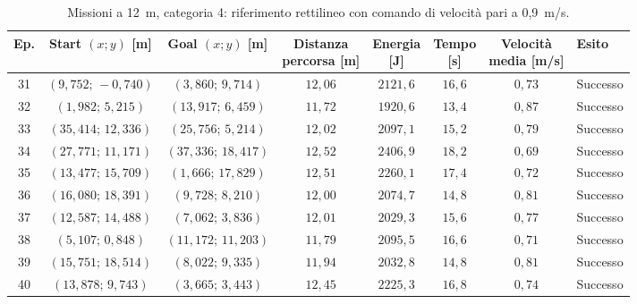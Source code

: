 \begin{table}[H]
\centering
\caption{Missioni a 12~m, categoria 4: riferimento rettilineo con comando di velocità pari a 0,9~m/s.}
\label{tab:straight-line-0-9-12m-cat4}
\begingroup
\fontsize{9}{11}\selectfont
\setlength{\tabcolsep}{2.5pt}
\renewcommand{\arraystretch}{1.2}
\begin{tabular}{@{}c cc cccc l@{}}
\toprule
Ep. & \shortstack{Start $(x;y)$\\{}[m]} & \shortstack{Goal $(x;y)$\\{}[m]} & \shortstack{Distanza\\percorsa [m]} & \shortstack{Energia\\{}[J]} & \shortstack{Tempo\\{}[s]} & \shortstack{Velocità\\media [m/s]} & Esito \\
\midrule
31 & $(9{,}752;\,-0{,}740)$ & $(3{,}860;\,9{,}714)$ & $12{,}06$ & $2121{,}6$ & $16{,}6$ & $0{,}73$ & Successo \\
32 & $(1{,}982;\,5{,}215)$ & $(13{,}917;\,6{,}459)$ & $11{,}72$ & $1920{,}6$ & $13{,}4$ & $0{,}87$ & Successo \\
33 & $(35{,}414;\,12{,}336)$ & $(25{,}756;\,5{,}214)$ & $12{,}02$ & $2097{,}1$ & $15{,}2$ & $0{,}79$ & Successo \\
34 & $(27{,}771;\,11{,}171)$ & $(37{,}336;\,18{,}417)$ & $12{,}52$ & $2406{,}9$ & $18{,}2$ & $0{,}69$ & Successo \\
35 & $(13{,}477;\,15{,}709)$ & $(1{,}666;\,17{,}829)$ & $12{,}51$ & $2260{,}1$ & $17{,}4$ & $0{,}72$ & Successo \\
36 & $(16{,}080;\,18{,}391)$ & $(9{,}728;\,8{,}210)$ & $12{,}00$ & $2074{,}7$ & $14{,}8$ & $0{,}81$ & Successo \\
37 & $(12{,}587;\,14{,}488)$ & $(7{,}062;\,3{,}836)$ & $12{,}01$ & $2029{,}3$ & $15{,}6$ & $0{,}77$ & Successo \\
38 & $(5{,}107;\,0{,}848)$ & $(11{,}172;\,11{,}203)$ & $11{,}79$ & $2095{,}5$ & $16{,}6$ & $0{,}71$ & Successo \\
39 & $(15{,}751;\,18{,}514)$ & $(8{,}022;\,9{,}335)$ & $11{,}94$ & $2032{,}8$ & $14{,}8$ & $0{,}81$ & Successo \\
40 & $(13{,}878;\,9{,}743)$ & $(3{,}665;\,3{,}443)$ & $12{,}45$ & $2225{,}3$ & $16{,}8$ & $0{,}74$ & Successo \\
\bottomrule
\end{tabular}
\endgroup
\end{table}
